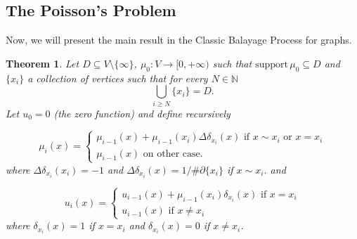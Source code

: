 \documentclass{article}
\newtheorem{theorem}{Theorem}
\begin{document}
\subsection{The Poisson's Problem}

Now, we will present the main result in the Classic Balayage Process for graphs.

\begin{theorem}
	Let $D\subseteq V\setminus \{\infty\}$, $\mu_0: V\rightarrow [0,+\infty)$ such that $\text{support}\, \mu_0\subseteq D$ and $\{x_i\}$ a collection of vertices such that for every $N\in \mathbb{N}$
	\[
	  \bigcup \limits_{i\geq N}\{x_i\}=D.
	\]
	Let $u_0=0$ (the zero function) and define recursively

           \[
           \mu_i(x)=
             \begin{cases}
                 \mu_{i-1}(x)+\mu_{i-1}(x_i)\Delta \delta_{x_i}(x) \text{ if } x\sim x_i \text{ or } x=x_i\\
                 \mu_{i-1}(x) \text{ on other case.}
             \end{cases}
           \]
           where $\Delta \delta_{x_i}(x_i)=-1$ and $\Delta \delta_{x_i}(x)=1/\#\partial \{ x_i \}$ if $x \sim x_i$.
    and 

    \[
           u_i(x)=
             \begin{cases}
                 u_{i-1}(x)+\mu_{i-1}(x_i) \delta_{x_i}(x) \text{ if } x=x_i\\
                 u_{i-1}(x) \text{ if } x\neq x_i
             \end{cases}
           \]
	where $\delta_{x_i}(x)=1$ if $x=x_i$ and $\delta_{x_i}(x)=0$ if $x\neq x_i$.
    
\end{theorem}
\end{document}
